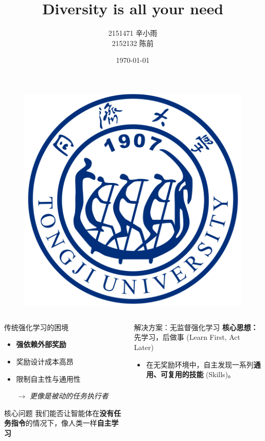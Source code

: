 \documentclass{beamer}
\author[同济大学国豪书院]
{
2151471 \quad 辛小雨
\\
2152132 \quad 陈前
}
\title{\textrm{Diversity is all your need}}
\institute
{
同济大学国豪书院
}
\date{\today}
\begin{document}
\begin{frame}
    \titlepage
    \begin{figure}[htpb]
       \begin{center}
            \includegraphics[width=0.2\linewidth]{pic/tongji_logo.png}
        \end{center}
    \end{figure}
\end{frame}

\begin{frame}
\tiny
     \begin{columns}[T] %

         \begin{column}{0.5\textwidth}
            \begin{block}{传统强化学习的困境}
                \begin{itemize}
                    \item \textbf{强依赖外部奖励}
                    \item 奖励设计成本高昂
                    \item 限制自主性与通用性
                    \item[$\rightarrow$] \textit{更像是被动的任务执行者}
                \end{itemize}
            \end{block}

            \begin{alertblock}{核心问题}
                 我们能否让智能体在\textbf{没有任务指令}的情况下，像人类一样\textbf{自主学习}
            \end{alertblock}
        \end{column}
        \begin{column}{0.5\textwidth}
            \begin{block}{解决方案：无监督强化学习}
                \textbf{核心思想：} 先学习，后做事 (Learn First, Act Later)
                \begin{itemize}
                    \item 在无奖励环境中，自主发现一系列\textbf{通用、可复用的技能} (Skills)。
                \end{itemize}
            \end{block}


\end{column}
\end{columns}
\end{frame}
\end{document}
